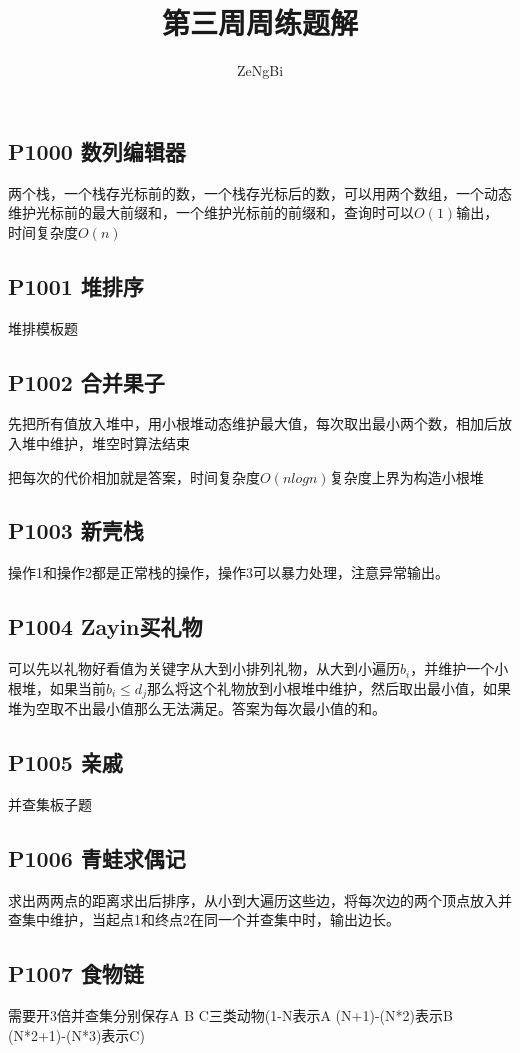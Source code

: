 \documentclass[UTF8]{ctexart}
\title{第三周周练题解}
\author{ZeNgBi}
\date{}
\begin{document}
	\maketitle
	\subsection*{P1000 数列编辑器}
	两个栈，一个栈存光标前的数，一个栈存光标后的数，可以用两个数组，一个动态维护光标前的最大前缀和，一个维护光标前的前缀和，查询时可以$O(1)$输出，时间复杂度$O(n)$
	
	\subsection*{P1001 堆排序}
	堆排模板题
	
	\subsection*{P1002 合并果子}
	先把所有值放入堆中，用小根堆动态维护最大值，每次取出最小两个数，相加后放入堆中维护，堆空时算法结束
	
	把每次的代价相加就是答案，时间复杂度$O(nlogn)$复杂度上界为构造小根堆
	
	\subsection*{P1003 新壳栈}
	操作1和操作2都是正常栈的操作，操作3可以暴力处理，注意异常输出。
	
	\subsection*{P1004 Zayin买礼物}
	可以先以礼物好看值为关键字从大到小排列礼物，从大到小遍历$b_i$，并维护一个小根堆，如果当前$b_i\leq d_j$那么将这个礼物放到小根堆中维护，然后取出最小值，如果堆为空取不出最小值那么无法满足。答案为每次最小值的和。
	
	\subsection*{P1005 亲戚}
	并查集板子题
	
	\subsection*{P1006 青蛙求偶记}
	求出两两点的距离求出后排序，从小到大遍历这些边，将每次边的两个顶点放入并查集中维护，当起点1和终点2在同一个并查集中时，输出边长。
	
	\subsection*{P1007 食物链}
	需要开3倍并查集分别保存A B C三类动物(1-N表示A (N+1)-(N*2)表示B (N*2+1)-(N*3)表示C)
	
\end{document}
